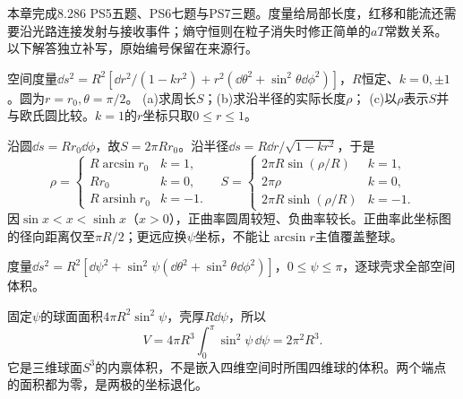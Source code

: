 本章完成8.286 PS5五题、PS6七题与PS7三题。度量给局部长度，红移和能流还需要沿光路连接发射与接收事件；熵守恒则在粒子消失时修正简单的$aT$常数关系。以下解答独立补写，原始编号保留在来源行。

\begin{exercise}
空间度量$\dd s^2=R^2[\dd r^2/(1-kr^2)+r^2(\dd\theta^2+\sin^2\theta\dd\phi^2)]$，$R$恒定、$k=0,\pm1$。圆为$r=r_0,\theta=\pi/2$。
(a)求周长$S$；(b)求沿半径的实际长度$\rho$；
(c)以$\rho$表示$S$并与欧氏圆比较。$k=1$的$r$坐标只取$0\le r\le1$。
\end{exercise}
\begin{solution}
沿圆$\dd s=Rr_0\dd\phi$，故$S=2\pi Rr_0$。沿半径$\dd s=R\dd r/\sqrt{1-kr^2}$，于是
\[
 \rho=\begin{cases}R\arcsin r_0&k=1,\\Rr_0&k=0,\\
 R\operatorname{arsinh}r_0&k=-1.\end{cases}
 \quad
 S=\begin{cases}2\pi R\sin(\rho/R)&k=1,\\2\pi\rho&k=0,\\
 2\pi R\sinh(\rho/R)&k=-1.\end{cases}
\]
因$\sin x<x<\sinh x$（$x>0$），正曲率圆周较短、负曲率较长。正曲率此坐标图的径向距离仅至$\pi R/2$；更远应换$\psi$坐标，不能让$\arcsin r$主值覆盖整球。
\end{solution}

\begin{exercise}
度量$\dd s^2=R^2[\dd\psi^2+\sin^2\psi(\dd\theta^2+\sin^2\theta\dd\phi^2)]$，$0\le\psi\le\pi$，逐球壳求全部空间体积。
\end{exercise}
\begin{solution}
固定$\psi$的球面面积$4\pi R^2\sin^2\psi$，壳厚$R\dd\psi$，所以
\[
 V=4\pi R^3\int_0^\pi\sin^2\psi\,\dd\psi=2\pi^2R^3.
\]
它是三维球面$S^3$的内禀体积，不是嵌入四维空间时所围四维球的体积。两个端点的面积都为零，是两极的坐标退化。
\end{solution}

